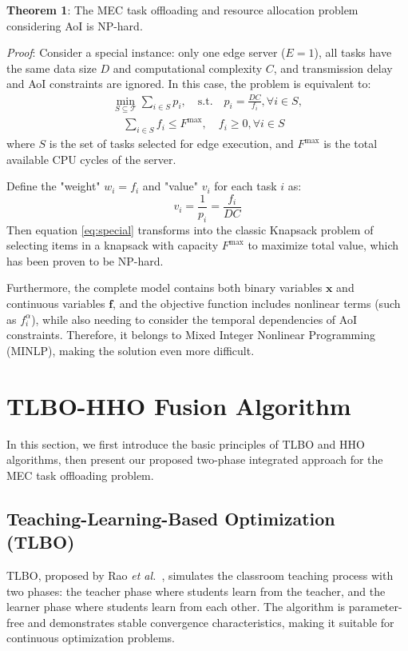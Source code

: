 \documentclass[conference]{IEEEtran}
\begin{document}
\textbf{Theorem 1}: The MEC task offloading and resource allocation problem considering AoI is NP-hard.

\textit{Proof}: Consider a special instance: only one edge server ($E = 1$), all tasks have the same data size $D$ and computational complexity $C$, and transmission delay and AoI constraints are ignored. In this case, the problem is equivalent to:
\begin{equation}
    \begin{split}
        \min_{S \subseteq \mathcal{T}} \sum_{i \in S} p_i, \quad
        \text{s.t.} \quad p_i = \frac{DC}{f_i}, \forall i \in S, \\
        \quad
        \sum_{i \in S} f_i \leq F^{\max}, \quad
        f_i \geq 0, \forall i \in S
    \end{split}
    \label{eq:special}
\end{equation}
where $S$ is the set of tasks selected for edge execution, and $F^{\max}$ is the total available CPU cycles of the server.

Define the "weight" $w_i = f_i$ and "value" $v_i$ for each task $i$ as:
\begin{equation}
v_i = \frac{1}{p_i} = \frac{f_i}{DC}
\end{equation}
Then equation \eqref{eq:special} transforms into the classic Knapsack problem of selecting items in a knapsack with capacity $F^{\max}$ to maximize total value, which has been proven to be NP-hard.

Furthermore, the complete model contains both binary variables $\mathbf{x}$ and continuous variables $\mathbf{f}$, and the objective function includes nonlinear terms (such as $f_i^{\alpha}$), while also needing to consider the temporal dependencies of AoI constraints. Therefore, it belongs to Mixed Integer Nonlinear Programming (MINLP), making the solution even more difficult.

\section{TLBO-HHO Fusion Algorithm}

In this section, we first introduce the basic principles of TLBO and HHO algorithms, then present our proposed two-phase integrated approach for the MEC task offloading problem.

\subsection{Teaching-Learning-Based Optimization (TLBO)}
TLBO, proposed by Rao \textit{et al.}~\cite{rao2011teaching}, simulates the classroom teaching process with two phases: the teacher phase where students learn from the teacher, and the learner phase where students learn from each other. The algorithm is parameter-free and demonstrates stable convergence characteristics, making it suitable for continuous optimization problems.
\end{document}
